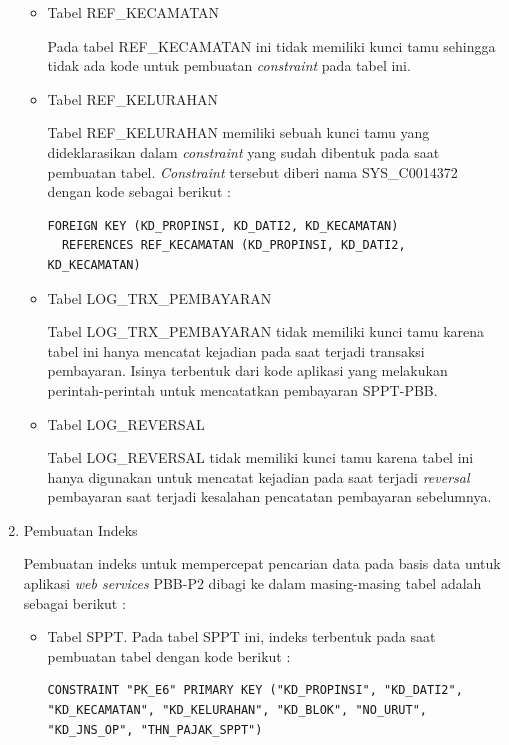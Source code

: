 \documentclass[pdftex,12pt, oneside]{article}
\begin{document}
\begin{enumerate}[1.]
\begin{itemize}
\begin{itemize}
		\end{itemize}
	
	\item Tabel REF\_KECAMATAN
	
		Pada tabel REF\_KECAMATAN ini tidak memiliki kunci tamu	sehingga tidak ada kode untuk pembuatan \textit{constraint} pada tabel ini.
	
	\item Tabel REF\_KELURAHAN
	
	Tabel REF\_KELURAHAN memiliki sebuah kunci tamu yang dideklarasikan dalam \textit{constraint} yang sudah dibentuk pada saat pembuatan tabel. \textit{Constraint} tersebut diberi nama SYS\_C0014372 dengan kode sebagai berikut :
	
\begin{lstlisting}
FOREIGN KEY (KD_PROPINSI, KD_DATI2, KD_KECAMATAN)
  REFERENCES REF_KECAMATAN (KD_PROPINSI, KD_DATI2, KD_KECAMATAN)
\end{lstlisting}
	
	\item Tabel LOG\_TRX\_PEMBAYARAN
	
	Tabel LOG\_TRX\_PEMBAYARAN tidak memiliki kunci tamu karena tabel ini hanya mencatat kejadian pada saat terjadi transaksi pembayaran. Isinya terbentuk dari kode aplikasi yang melakukan perintah-perintah untuk mencatatkan pembayaran SPPT-PBB.
	
	\item Tabel LOG\_REVERSAL
	
	Tabel LOG\_REVERSAL tidak memiliki kunci tamu karena tabel ini hanya digunakan untuk mencatat kejadian pada saat terjadi \textit{reversal} pembayaran saat terjadi kesalahan pencatatan pembayaran sebelumnya.
	
	\end{itemize}

	
	\item Pembuatan Indeks
	
	Pembuatan indeks untuk mempercepat pencarian data pada basis data untuk aplikasi \textit{web services} PBB-P2 dibagi ke dalam masing-masing tabel adalah sebagai berikut :
	
	\begin{itemize}
	  \item Tabel SPPT. Pada tabel SPPT ini, indeks terbentuk pada saat pembuatan tabel dengan kode berikut :
	  
\begin{lstlisting}
CONSTRAINT "PK_E6" PRIMARY KEY ("KD_PROPINSI", "KD_DATI2", "KD_KECAMATAN", "KD_KELURAHAN", "KD_BLOK", "NO_URUT", "KD_JNS_OP", "THN_PAJAK_SPPT")
\end{lstlisting}
	  

\end{itemize}
\end{enumerate}
\end{document}
